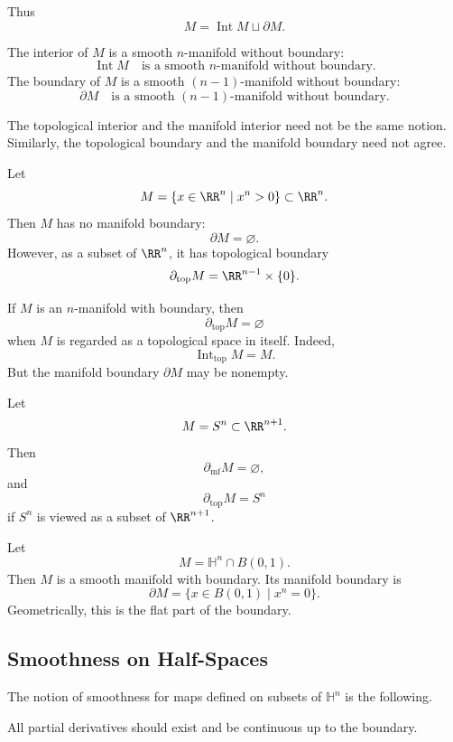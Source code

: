 Thus
\[
  M=\operatorname{Int}M\sqcup \partial M.
\]

\begin{remark}
The interior of $M$ is a smooth $n$-manifold without boundary:
\[
  \operatorname{Int}M
  \quad
  \text{is a smooth $n$-manifold without boundary.}
\]
The boundary of $M$ is a smooth $(n-1)$-manifold without boundary:
\[
  \partial M
  \quad
  \text{is a smooth $(n-1)$-manifold without boundary.}
\]
\end{remark}

\begin{remark}
The topological interior and the manifold interior need not be the same notion.
Similarly, the topological boundary and the manifold boundary need not agree.
\end{remark}

\begin{example}
Let
\[
  M=\{x\in\RR^n\mid x^n>0\}\subset \RR^n.
\]
Then $M$ has no manifold boundary:
\[
  \partial M=\varnothing.
\]
However, as a subset of $\RR^n$, it has topological boundary
\[
  \partial_{\mathrm{top}}M=\RR^{n-1}\times\{0\}.
\]
\end{example}

\begin{example}
If $M$ is an $n$-manifold with boundary, then
\[
  \partial_{\mathrm{top}}M=\varnothing
\]
when $M$ is regarded as a topological space in itself. Indeed,
\[
  \operatorname{Int}_{\mathrm{top}}M=M.
\]
But the manifold boundary $\partial M$ may be nonempty.
\end{example}

\begin{example}
Let
\[
  M=S^n\subset \RR^{n+1}.
\]
Then
\[
  \partial_{\mathrm{mf}}M=\varnothing,
\]
and
\[
  \partial_{\mathrm{top}}M=S^n
\]
if $S^n$ is viewed as a subset of $\RR^{n+1}$.
\end{example}

\begin{example}
Let
\[
  M=\mathbb H^n\cap B(0,1).
\]
Then $M$ is a smooth manifold with boundary. Its manifold boundary is
\[
  \partial M
  =
  \{x\in B(0,1)\mid x^n=0\}.
\]
Geometrically, this is the flat part of the boundary.
\end{example}


\subsection{Smoothness on Half-Spaces}

\begin{remark}
The notion of smoothness for maps defined on subsets of $\mathbb H^n$ is the following.

All partial derivatives should exist and be continuous up to the boundary.
\end{remark}

